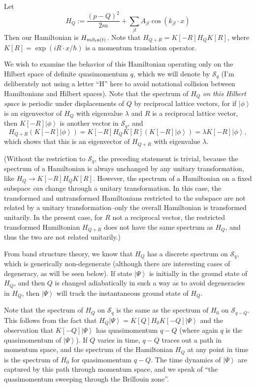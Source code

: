 \documentclass[aps,prb,floatfix,amsmath,amssymb,groupedaddress]{revtex4}
\begin{document}
Let $$H_Q := \frac{\left(p - Q\right)^2}{2m} + \sum_{jl}A_{jl} \cos(k_{jl}\cdot x)$$
Then our Hamiltonian is $H_{m{\partial_t} a(t)}$.  Note that $H_{Q+R} = K[-R]H_Q K[R]$, where $K[R] = \exp(iR\cdot x/\hbar)$ is a momentum translation operator.  

We wish to examine the behavior of this Hamiltonian operating only on the Hilbert space of definite quasimomentum $q$, which we will denote by $\mathcal{S}_q$ (I'm deliberately not using a letter ``H'' here to avoid notational collision between Hamiltonians and Hilbert spaces).  Note that the spectrum of $H_Q$ \textit{on this Hilbert space} is periodic under displacements of $Q$ by reciprocal lattice vectors, for if $\left|\phi\right>$ is an eigenvector of $H_Q$ with eigenvalue $\lambda$ and $R$ is a reciprocal lattice vector, then $K[-R]\left|\phi\right>$ is another vector in $\mathcal{S}_q$, and $$H_{Q+R} \left(K[-R] \left|\phi\right>\right) = K[-R]H_Q K[R] \left(K[-R] \left|\phi\right>\right) = \lambda K[-R]\left|\phi\right>,$$ which shows that this is an eigenvector of $H_{Q+R}$ with eigenvalue $\lambda$.  

(Without the restriction to $\mathcal{S}_q$, the preceding statement is trivial, because the spectrum of a Hamiltonian is always unchanged by any unitary transformation, like $H_Q\rightarrow K[-R]H_Q K[R]$.  However, the spectrum of a Hamiltonian on a fixed subspace \textit{can} change through a unitary transformation.  In this case, the transformed and untransformed Hamiltonians restricted to the subspace are not related by a unitary transformation--only the overall Hamiltonian is transformed unitarily.  In the present case, for $R$ not a reciprocal vector, the restricted transformed Hamiltonian $H_{Q+R}$ does not have the same spectrum as $H_Q$, and thus the two are not related unitarily.)  

From band structure theory, we know that $H_Q$ has a discrete spectrum on $\mathcal{S}_q$, which is generically non-degenerate (although there are interesting cases of degeneracy, as will be seen below).  If state $\left|\Psi\right>$ is initially in the ground state of $H_Q$, and then $Q$ is changed adiabatically in such a way as to avoid degeneracies in $H_Q$, then $\left|\Psi\right>$ will track the instantaneous ground state of $H_Q$.  

Note that the spectrum of $H_Q$ on $\mathcal{S}_q$ is the same as the spectrum of $H_0$ on $\mathcal{S}_{q-Q}$.  This follows from the fact that $H_Q\left|\Psi\right> = K[Q]H_0 K[-Q]\left|\Psi\right>$ and the observation that $K[-Q]\left|\Psi\right>$ has quasimomentum $q-Q$ (where again $q$ is the quasimomentum of $\left|\Psi\right>$).  If $Q$ varies in time, $q-Q$ traces out a path in momentum space, and the spectrum of the Hamiltonian $H_Q$ at any point in time is the spectrum of $H_0$ for quasimomentum $q-Q$.  The time dynamics of $\left|\Psi\right>$ are captured by this path through momentum space, and we speak of ``the quasimomentum sweeping through the Brillouin zone''.  
\end{document}
